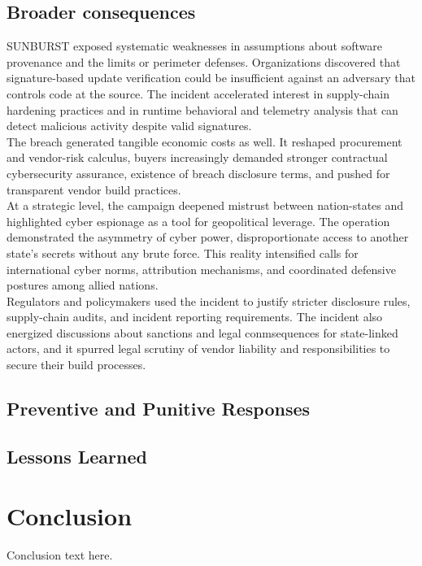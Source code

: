 \documentclass[conference]{IEEEtran}
\begin{document}
\subsection{Broader consequences}
SUNBURST exposed systematic weaknesses in assumptions about software provenance and the limits or perimeter defenses. Organizations discovered
that signature-based update verification could be insufficient against an adversary that controls code at the source. The incident accelerated
interest in supply-chain hardening practices and in runtime behavioral and telemetry analysis that can detect malicious activity despite valid 
signatures.\\
The breach generated tangible economic costs as well. It reshaped procurement and vendor-risk calculus, buyers increasingly demanded stronger
contractual cybersecurity assurance, existence of breach disclosure terms, and pushed for transparent vendor build practices.\\
At a strategic level, the campaign deepened mistrust between nation-states and highlighted cyber espionage as a tool for geopolitical leverage.
The operation demonstrated the asymmetry of cyber power, disproportionate access to another state's secrets without any brute force. This reality
intensified calls for international cyber norms, attribution mechanisms, and coordinated defensive postures among allied nations.\\
Regulators and policymakers used the incident to justify stricter disclosure rules, supply-chain audits, and incident reporting requirements\cite{NCSC2021FurtherTTPsSVR}.
The incident also energized discussions about sanctions and legal conmsequences for state-linked actors, and it spurred legal scrutiny of vendor liability
and responsibilities to secure their build processes.
\subsection{Preventive and Punitive Responses}
\subsection{Lessons Learned}

\section{Conclusion}


Conclusion text here.
\end{document}
